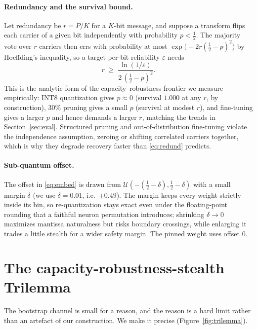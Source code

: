 \documentclass[10pt,journal]{IEEEtran}
\theoremstyle{remark}
\begin{document}
\paragraph{Redundancy and the survival bound.} Let redundancy be $r=P/K$ for a
$K$-bit message, and suppose a transform flips each carrier of a given bit independently
with probability $p<\tfrac12$. The majority vote over $r$ carriers then errs with
probability at most $\exp\!\big(-2r(\tfrac12-p)^2\big)$ by Hoeffding's inequality, so a
target per-bit reliability $\varepsilon$ needs
\begin{equation}\label{eq:redund}
r \;\ge\; \frac{\ln(1/\varepsilon)}{2\,(\tfrac12-p)^2}.
\end{equation}
This is the analytic form of the capacity--robustness frontier we measure empirically:
INT8 quantization gives $p\approx0$ (survival $1.000$ at any $r$, by construction),
$30\%$ pruning gives a small $p$ (survival at modest $r$), and fine-tuning gives a larger
$p$ and hence demands a larger $r$, matching the trends in
Section~\ref{sec:eval}. Structured pruning and out-of-distribution fine-tuning violate
the independence assumption, zeroing or shifting correlated carriers together, which is
why they degrade recovery faster than \eqref{eq:redund} predicts.

\paragraph{Sub-quantum offset.} The offset in \eqref{eq:embed} is drawn from
$\mathcal{U}(-(\tfrac12-\delta),\tfrac12-\delta)$ with a small margin $\delta$ (we use
$\delta=0.01$, i.e.\ $\pm0.49$). The margin keeps every weight strictly inside its bin, so
re-quantization stays exact even under the floating-point rounding that a faithful neuron
permutation introduces; shrinking $\delta\to0$ maximizes mantissa naturalness but risks
boundary crossings, while enlarging it trades a little stealth for a wider safety margin.
The pinned weight uses offset $0$.

\section{The capacity-robustness-stealth Trilemma}\label{sec:trilemma}
The bootstrap channel is small for a reason, and the reason is a hard limit rather than
an artefact of our construction. We make it precise (Figure~\ref{fig:trilemma}).
\end{document}
